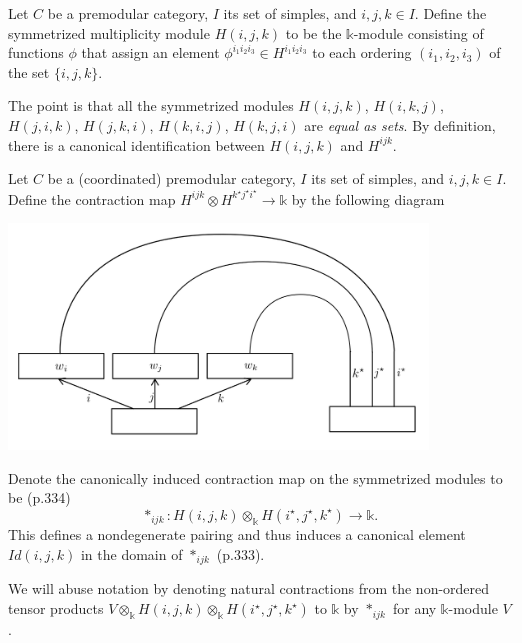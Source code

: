 \begin{definition}\label{def/symmetrized-multiplicity-module}
  Let $C$ be a premodular category, $I$ its set of simples, and
  $i, j, k \in I$. Define the symmetrized multiplicity module
  $H(i,j,k)$ to be the $\mathbb{k}$-module consisting of
  functions $\phi$ that assign an element
  $\phi^{i_{1}i_{2}i_{3}} \in H^{i_{1}i_{2}i_{3}}$ to each
  ordering $(i_{1}, i_{2}, i_{3})$ of the set $\{i, j, k\}$.
\end{definition}

\noindent The point is that all the symmetrized modules
$H(i,j,k)$, $H(i,k,j)$, $H(j,i,k)$, $H(j,k,i)$, $H(k,i,j)$,
$H(k,j,i)$ are \textit{equal as sets}. By definition, there is a
canonical identification between $H(i,j,k)$ and $H^{ijk}$.

\begin{definition}[contraction]\label{def/contraction}
  Let $C$ be a (coordinated) premodular category, $I$ its set of
  simples, and $i, j, k \in I$. Define the contraction map
  $H^{ijk} \otimes H^{k^{\star}j^{\star}i^{\star}} \to \mathbb{k}$
  by the following diagram 
  \begin{center}
    \includegraphics[height=6cm]{pairing}
  \end{center}
  Denote the canonically induced contraction map on the
  symmetrized modules to be (p.334)
  $$\ast_{ijk}: H(i,j,k) \otimes_{\mathbb{k}} H(i^{\star}, j^{\star}, k^{\star}) \to \mathbb{k}.$$
  This defines a nondegenerate pairing and thus induces a
  canonical element $Id(i,j,k)$ in the domain of $\ast_{ijk}$
  (p.333).
\end{definition}

\noindent We will abuse notation by denoting natural contractions
from the non-ordered tensor products
$V \otimes_{\mathbb{k}} H(i,j,k) \otimes_{\mathbb{k}} H(i^{\star}, j^{\star}, k^{\star})$
to $\mathbb{k}$ by $\ast_{ijk}$ for any $\mathbb{k}$-module $V$.

